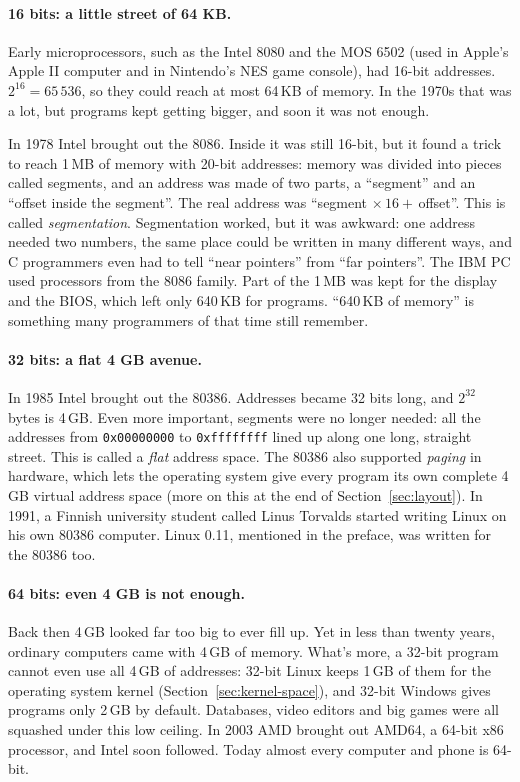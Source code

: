 \paragraph{16 bits: a little street of 64 KB.}
Early microprocessors, such as the Intel 8080 and the MOS 6502 (used in Apple's Apple II computer and in Nintendo's NES game console), had 16-bit addresses. $2^{16} = 65\,536$, so they could reach at most 64\,KB of memory. In the 1970s that was a lot, but programs kept getting bigger, and soon it was not enough.

In 1978 Intel brought out the 8086. Inside it was still 16-bit, but it found a trick to reach 1\,MB of memory with 20-bit addresses: memory was divided into pieces called segments, and an address was made of two parts, a ``segment'' and an ``offset inside the segment''. The real address was ``segment\,${}\times 16 +{}$\,offset''. This is called \emph{segmentation}. Segmentation worked, but it was awkward: one address needed two numbers, the same place could be written in many different ways, and C programmers even had to tell ``near pointers'' from ``far pointers''. The IBM PC used processors from the 8086 family. Part of the 1\,MB was kept for the display and the BIOS, which left only 640\,KB for programs. ``640\,KB of memory'' is something many programmers of that time still remember.

\paragraph{32 bits: a flat 4 GB avenue.}
In 1985 Intel brought out the 80386. Addresses became 32 bits long, and $2^{32}$ bytes is 4\,GB. Even more important, segments were no longer needed: all the addresses from \texttt{0x00000000} to \texttt{0xffffffff} lined up along one long, straight street. This is called a \emph{flat} address space. The 80386 also supported \emph{paging} in hardware, which lets the operating system give every program its own complete 4\,GB virtual address space (more on this at the end of Section~\ref{sec:layout}). In 1991, a Finnish university student called Linus Torvalds started writing Linux on his own 80386 computer. Linux 0.11, mentioned in the preface, was written for the 80386 too.

\paragraph{64 bits: even 4 GB is not enough.}
Back then 4\,GB looked far too big to ever fill up. Yet in less than twenty years, ordinary computers came with 4\,GB of memory. What's more, a 32-bit program cannot even use all 4\,GB of addresses: 32-bit Linux keeps 1\,GB of them for the operating system kernel (Section~\ref{sec:kernel-space}), and 32-bit Windows gives programs only 2\,GB by default. Databases, video editors and big games were all squashed under this low ceiling. In 2003 AMD brought out AMD64, a 64-bit x86 processor, and Intel soon followed. Today almost every computer and phone is 64-bit.

